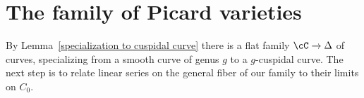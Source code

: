 %
%
%
%
%

%
%

\section{The family of Picard varieties}\label{Picard family}

By Lemma~\ref{specialization to cuspidal curve} there is a flat family $\cC \to \Delta$ of curves, specializing from a smooth curve of genus $g$ to a $g$-cuspidal curve. The next step is to relate linear series on the general fiber of our family to their limits on $C_0$.


